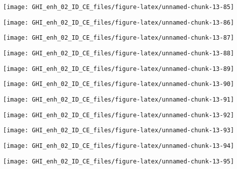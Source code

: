 \documentclass[
  10pt,
  a4paper,oneside]{article}
\begin{document}
\begin{center}\texttt{[image: GHI\_enh\_02\_ID\_CE\_files/figure-latex/unnamed-chunk-13-85]} \end{center}

\begin{center}\texttt{[image: GHI\_enh\_02\_ID\_CE\_files/figure-latex/unnamed-chunk-13-86]} \end{center}

\begin{center}\texttt{[image: GHI\_enh\_02\_ID\_CE\_files/figure-latex/unnamed-chunk-13-87]} \end{center}

\begin{center}\texttt{[image: GHI\_enh\_02\_ID\_CE\_files/figure-latex/unnamed-chunk-13-88]} \end{center}

\begin{center}\texttt{[image: GHI\_enh\_02\_ID\_CE\_files/figure-latex/unnamed-chunk-13-89]} \end{center}

\begin{center}\texttt{[image: GHI\_enh\_02\_ID\_CE\_files/figure-latex/unnamed-chunk-13-90]} \end{center}

\begin{center}\texttt{[image: GHI\_enh\_02\_ID\_CE\_files/figure-latex/unnamed-chunk-13-91]} \end{center}

\begin{center}\texttt{[image: GHI\_enh\_02\_ID\_CE\_files/figure-latex/unnamed-chunk-13-92]} \end{center}

\begin{center}\texttt{[image: GHI\_enh\_02\_ID\_CE\_files/figure-latex/unnamed-chunk-13-93]} \end{center}

\begin{center}\texttt{[image: GHI\_enh\_02\_ID\_CE\_files/figure-latex/unnamed-chunk-13-94]} \end{center}

\begin{center}\texttt{[image: GHI\_enh\_02\_ID\_CE\_files/figure-latex/unnamed-chunk-13-95]} \end{center}
\end{document}
